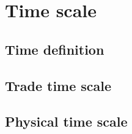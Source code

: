\section{Time scale}\label{sec:time_scale}


\subsection{Time definition}\label{subsec:time_definition}

\subsection{Trade time scale}\label{subsec:trade_time}

\subsection{Physical time scale}\label{subsec:physical_time}

